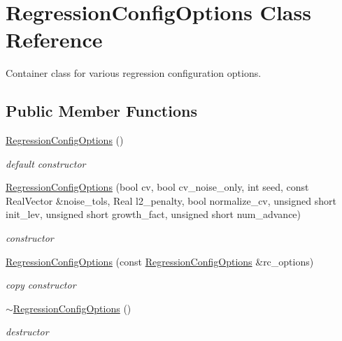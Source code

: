 \section{Regression\+Config\+Options Class Reference}
\label{classPecos_1_1RegressionConfigOptions}


Container class for various regression configuration options.  


\subsection*{Public Member Functions}
\begin{DoxyCompactItemize}
\item 
\hyperlink{classPecos_1_1RegressionConfigOptions_ac7dbcf08baa6a5ecc6ec65ba2fc86cad}{Regression\+Config\+Options} ()\label{classPecos_1_1RegressionConfigOptions_ac7dbcf08baa6a5ecc6ec65ba2fc86cad}

\begin{DoxyCompactList}\small\item\em default constructor \end{DoxyCompactList}\item 
\hyperlink{classPecos_1_1RegressionConfigOptions_a26d7cd26a502c03aea371a152a6ca978}{Regression\+Config\+Options} (bool cv, bool cv\+\_\+noise\+\_\+only, int seed, const Real\+Vector \&noise\+\_\+tols, Real l2\+\_\+penalty, bool normalize\+\_\+cv, unsigned short init\+\_\+lev, unsigned short growth\+\_\+fact, unsigned short num\+\_\+advance)\label{classPecos_1_1RegressionConfigOptions_a26d7cd26a502c03aea371a152a6ca978}

\begin{DoxyCompactList}\small\item\em constructor \end{DoxyCompactList}\item 
\hyperlink{classPecos_1_1RegressionConfigOptions_a81c3d4db99e8b29c215093344c00a204}{Regression\+Config\+Options} (const \hyperlink{classPecos_1_1RegressionConfigOptions}{Regression\+Config\+Options} \&rc\+\_\+options)\label{classPecos_1_1RegressionConfigOptions_a81c3d4db99e8b29c215093344c00a204}

\begin{DoxyCompactList}\small\item\em copy constructor \end{DoxyCompactList}\item 
\hyperlink{classPecos_1_1RegressionConfigOptions_afa9dd19c9f06f01d6fbd4a102772ecae}{$\sim$\+Regression\+Config\+Options} ()\label{classPecos_1_1RegressionConfigOptions_afa9dd19c9f06f01d6fbd4a102772ecae}

\begin{DoxyCompactList}\small\item\em destructor \end{DoxyCompactList}\end{DoxyCompactItemize}
